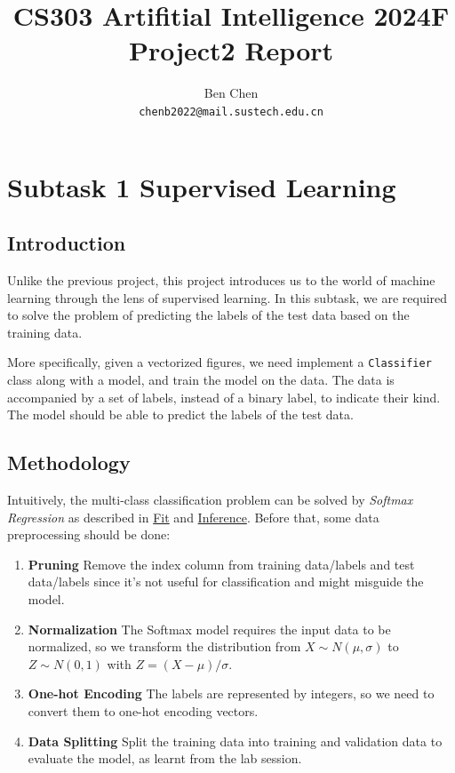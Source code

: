 \documentclass{article}
\title{\textbf{CS303 Artifitial Intelligence 2024F Project2 Report}}
\author{Ben Chen \\ \texttt{chenb2022@mail.sustech.edu.cn}}
\begin{document}
\maketitle

\section{Subtask 1 Supervised Learning}

\subsection{Introduction}

Unlike the previous project, this project introduces us to the world of machine learning through the lens of supervised learning. In this subtask, we are required to solve the problem of predicting the labels of the test data based on the training data.

More specifically, given a vectorized figures, we need implement a \texttt{Classifier} class along with a model, and train the model on the data. The data is accompanied by a set of labels, instead of a binary label, to indicate their kind. The model should be able to predict the labels of the test data.

\subsection{Methodology}

Intuitively, the multi-class classification problem can be solved by \textit{Softmax Regression} as described in \href{alg:softmax-fit}{Fit} and \href{alg:softmax-infer}{Inference}. Before that, some data preprocessing should be done:
\begin{enumerate}
    \item \textbf{Pruning} Remove the index column from training data/labels and test data/labels since it's not useful for classification and might misguide the model.
    \item \textbf{Normalization} The Softmax model requires the input data to be normalized, so we transform the distribution from $X \sim N(\mu, \sigma)$ to $Z \sim N(0, 1)$ with $Z = (X - \mu) / {\sigma}$.
    \item \textbf{One-hot Encoding} The labels are represented by integers, so we need to convert them to one-hot encoding vectors.
    \item \textbf{Data Splitting} Split the training data into training and validation data to evaluate the model, as learnt from the lab session.
\end{enumerate}
\end{document}
